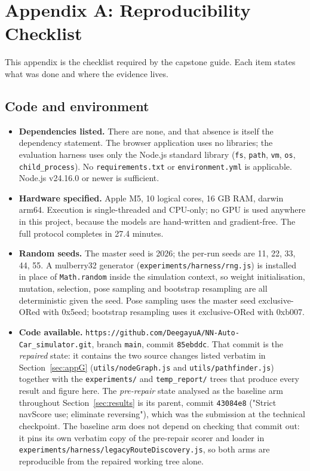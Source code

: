 \documentclass[conference]{IEEEtran}
\begin{document}
\section*{Appendix A: Reproducibility Checklist}

\label{sec:appA}

This appendix is the checklist required by the capstone guide. Each item states what was done and where the evidence lives.

\subsection{Code and environment}

\begin{itemize}
\item[$\boxtimes$] \textbf{Dependencies listed.} There are none, and that absence is itself the dependency statement. The browser application uses no libraries; the evaluation harness uses only the Node.js standard library (\texttt{fs}, \texttt{path}, \texttt{vm}, \texttt{os}, \texttt{child\_process}). No \texttt{requirements.txt} or \texttt{environment.yml} is applicable. Node.js v24.16.0 or newer is sufficient.
\item[$\boxtimes$] \textbf{Hardware specified.} Apple M5, 10 logical cores, 16 GB RAM, darwin arm64. Execution is single-threaded and CPU-only; no GPU is used anywhere in this project, because the models are hand-written and gradient-free. The full protocol completes in 27.4 minutes.
\item[$\boxtimes$] \textbf{Random seeds.} The master seed is 2026; the per-run seeds are 11, 22, 33, 44, 55. A mulberry32 generator (\texttt{experiments/harness/rng.js}) is installed in place of \texttt{Math.random} inside the simulation context, so weight initialisation, mutation, selection, pose sampling and bootstrap resampling are all deterministic given the seed. Pose sampling uses the master seed exclusive-ORed with 0x5eed; bootstrap resampling uses it exclusive-ORed with 0xb007.
\item[$\boxtimes$] \textbf{Code available.} \texttt{https://github.com/DeegayuA/NN-Auto-Car\_simulator.git}, branch \texttt{main}, commit \texttt{85ebddc}. That commit is the \emph{repaired} state: it contains the two source changes listed verbatim in Section~\ref{sec:appG} (\texttt{utils/nodeGraph.js} and \texttt{utils/pathfinder.js}) together with the \texttt{experiments/} and \texttt{temp\_report/} trees that produce every result and figure here. The \emph{pre-repair} state analysed as the baseline arm throughout Section~\ref{sec:results} is its parent, commit \texttt{43084e8} ("Strict navScore use; eliminate reversing"), which was the submission at the technical checkpoint. The baseline arm does not depend on checking that commit out: it pins its own verbatim copy of the pre-repair scorer and loader in \texttt{experiments/harness/legacyRouteDiscovery.js}, so both arms are reproducible from the repaired working tree alone.
\end{itemize}
\end{document}
